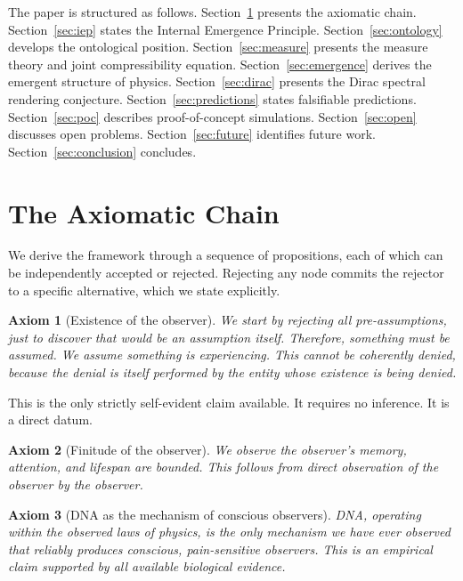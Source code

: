 \documentclass[12pt,a4paper]{article}
\newtheorem{axiom}{Axiom}
\begin{document}
The paper is structured as follows. Section~\ref{sec:axioms} presents the
axiomatic chain. Section~\ref{sec:iep} states the Internal Emergence Principle.
Section~\ref{sec:ontology} develops the ontological position.
Section~\ref{sec:measure} presents the measure theory and joint compressibility
equation. Section~\ref{sec:emergence} derives the emergent structure of physics.
Section~\ref{sec:dirac} presents the Dirac spectral rendering conjecture.
Section~\ref{sec:predictions} states falsifiable predictions.
Section~\ref{sec:poc} describes proof-of-concept simulations.
Section~\ref{sec:open} discusses open problems.
Section~\ref{sec:future} identifies future work.
Section~\ref{sec:conclusion} concludes.

\section{The Axiomatic Chain}
\label{sec:axioms}

We derive the framework through a sequence of propositions, each of which can
be independently accepted or rejected. Rejecting any node commits the rejector
to a specific alternative, which we state explicitly.

\begin{axiom}[Existence of the observer]
\label{ax:exist}
We start by rejecting all pre-assumptions, just to discover that would be an
assumption itself. Therefore, something must be assumed.
We assume something is experiencing.
This cannot be coherently denied, because the denial
is itself performed by the entity whose existence is being denied.
\end{axiom}

This is the only strictly self-evident claim available. It requires no
inference. It is a direct datum.

\begin{axiom}[Finitude of the observer]
\label{ax:finite}
We observe the observer's memory, attention, and lifespan are bounded. This follows from
direct observation of the observer by the observer.
\end{axiom}

\begin{axiom}[DNA as the mechanism of conscious observers]
\label{ax:dna}
DNA, operating within the observed laws of physics, is the only mechanism we
have ever observed that reliably produces conscious, pain-sensitive observers.
This is an empirical claim supported by all available biological evidence.
\end{axiom}
\end{document}

